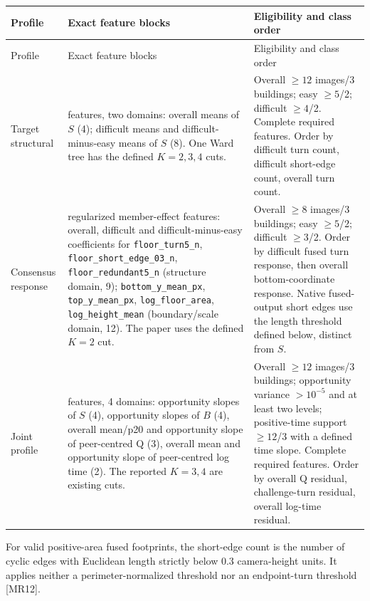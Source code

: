 \begingroup\small
\begin{longtable}{>{\raggedright\arraybackslash}p{.19\linewidth}>{\raggedright\arraybackslash}p{.49\linewidth}>{\raggedright\arraybackslash}p{.23\linewidth}}
\toprule
Profile & Exact feature blocks & Eligibility and class order \\
\midrule\endfirsthead
\toprule Profile & Exact feature blocks & Eligibility and class order \\
\midrule\endhead
Target structural

&
12 features, two domains: overall means of $S$ (4); difficult means and
difficult-minus-easy means of $S$ (8).
One Ward tree has the defined $K=2,3,4$ cuts.
&
Overall $\geq12$ images/3 buildings; easy $\geq5$/2; difficult $\geq4$/2.
Complete required features.
Order by difficult turn count, difficult short-edge count, overall turn count.
\\[3pt]
Consensus response

&
21 regularized member-effect features: overall, difficult and
difficult-minus-easy coefficients for
\texttt{floor\_turn5\_n},
\texttt{floor\_short\_edge\_03\_n},
\texttt{floor\_redundant5\_n} (structure domain, 9);
\texttt{bottom\_y\_mean\_px}, \texttt{top\_y\_mean\_px},
\texttt{log\_floor\_area}, \texttt{log\_height\_mean}
(boundary/scale domain, 12).
The paper uses the defined $K=2$ cut.
&
Overall $\geq8$ images/3 buildings; easy $\geq5$/2; difficult $\geq3$/2.
Order by difficult fused turn response, then overall bottom-coordinate response.
Native fused-output short edges use the length threshold defined below,
distinct from $S$.
\\[3pt]
Joint profile

&
13 features, 4 domains: opportunity slopes of $S$ (4), opportunity slopes
of $B$ (4), overall mean/p20 and opportunity slope of peer-centred Q (3),
overall mean and opportunity slope of peer-centred log time (2).
The reported $K=3,4$ are existing cuts.
&
Overall $\geq12$ images/3 buildings; opportunity variance $>10^{-5}$ and
at least two levels; positive-time support $\geq12$/3 with a defined time slope.
Complete required features.
Order by overall Q residual, challenge-turn residual, overall log-time residual.
\\
\bottomrule
\end{longtable}
\endgroup

For valid positive-area fused footprints, the short-edge count is the number
of cyclic edges with Euclidean length strictly below 0.3 camera-height units.
It applies neither a perimeter-normalized threshold nor an endpoint-turn
threshold [MR12].

